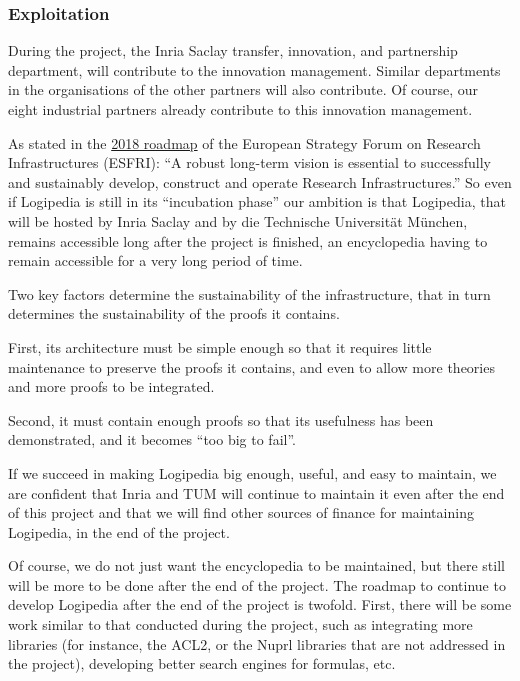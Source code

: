 \subsubsection*{Exploitation}

During the project, the Inria Saclay transfer, innovation, and
partnership department, will contribute to the innovation management.
Similar departments in the organisations  of the other partners will 
also contribute. Of course, our eight industrial partners already 
contribute to this innovation management.

As stated in the \href{http://roadmap2018.esfri.eu/media/1048/rm2018-part1-20.pdf}{2018 roadmap} of the
European Strategy Forum on Research Infrastructures (ESFRI): ``A robust
long-term vision is essential to successfully and sustainably develop,
construct and operate Research Infrastructures.'' So even if
Logipedia is still in its ``incubation phase'' our ambition is that
Logipedia, that will be hosted by Inria Saclay and by die Technische
Universität München, remains accessible long after the project is
finished, an encyclopedia having to remain accessible for a very long
period of time.

Two key factors determine the sustainability of the infrastructure,
that in turn determines the sustainability of the proofs it contains.
\begin{compactitem}
\item First, its architecture must be simple enough so that it requires
  little maintenance to preserve the proofs it contains, and even to
  allow more theories and more proofs to be integrated.
\item Second, it must contain enough proofs so that its usefulness has been
demonstrated, and it becomes ``too big to fail''.
\end{compactitem}

If we succeed in making Logipedia big enough, useful, and easy to
maintain, we are confident that Inria and TUM will continue to
maintain it even after the end of this project and that we will find
other sources of finance for maintaining Logipedia, in the end of the
project.

Of course, we do not just want the encyclopedia to be maintained, but
there still will be more to be done after the end of the project. The
roadmap to continue to develop Logipedia after the end of the project
is twofold. First, there will be some work similar to that conducted
during the project, such as integrating more libraries (for instance,
the ACL2, or the Nuprl libraries that are not addressed in the
project), developing better search engines for formulas, etc.

